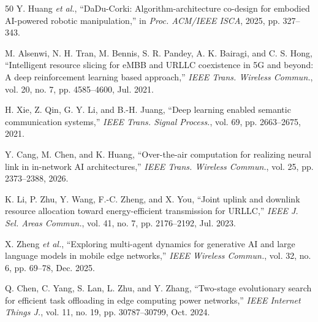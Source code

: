\documentclass[letterpaper,journal]{IEEEtran}
\newcommand{\etal}{\emph{et al.}}
\begin{document}
\begin{thebibliography}{50}
Y. Huang \etal, ``DaDu-Corki: Algorithm-architecture co-design for embodied
AI-powered robotic manipulation,'' in \emph{Proc. ACM/IEEE ISCA}, 2025,
pp. 327--343.

M. Alsenwi, N. H. Tran, M. Bennis, S. R. Pandey, A. K. Bairagi, and
C. S. Hong, ``Intelligent resource slicing for eMBB and URLLC coexistence in
5G and beyond: A deep reinforcement learning based approach,'' \emph{IEEE
Trans. Wireless Commun.}, vol. 20, no. 7, pp. 4585--4600, Jul. 2021.

H. Xie, Z. Qin, G. Y. Li, and B.-H. Juang, ``Deep learning enabled semantic
communication systems,'' \emph{IEEE Trans. Signal Process.}, vol. 69,
pp. 2663--2675, 2021.

Y. Cang, M. Chen, and K. Huang, ``Over-the-air computation for realizing
neural link in in-network AI architectures,'' \emph{IEEE Trans. Wireless
Commun.}, vol. 25, pp. 2373--2388, 2026.

K. Li, P. Zhu, Y. Wang, F.-C. Zheng, and X. You, ``Joint uplink and downlink
resource allocation toward energy-efficient transmission for URLLC,''
\emph{IEEE J. Sel. Areas Commun.}, vol. 41, no. 7, pp. 2176--2192,
Jul. 2023.

X. Zheng \etal, ``Exploring multi-agent dynamics for generative AI and large
language models in mobile edge networks,'' \emph{IEEE Wireless Commun.},
vol. 32, no. 6, pp. 69--78, Dec. 2025.

Q. Chen, C. Yang, S. Lan, L. Zhu, and Y. Zhang, ``Two-stage evolutionary
search for efficient task offloading in edge computing power networks,''
\emph{IEEE Internet Things J.}, vol. 11, no. 19, pp. 30787--30799,
Oct. 2024.

\end{thebibliography}
\end{document}
